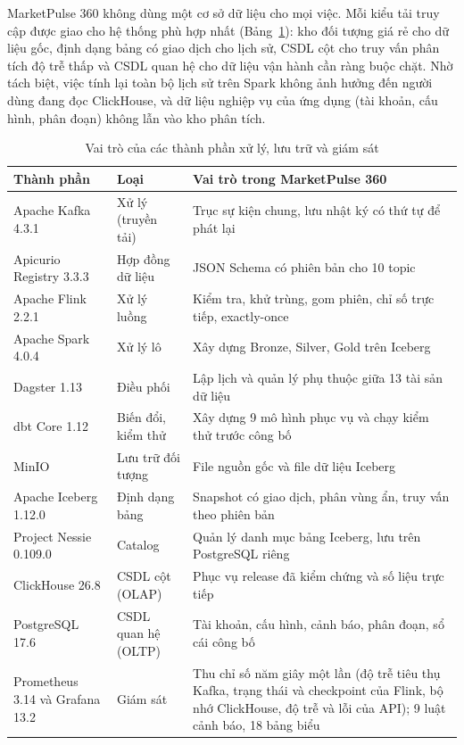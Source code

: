 MarketPulse 360 không dùng một cơ sở dữ liệu cho mọi việc. Mỗi kiểu tải truy cập được giao cho hệ thống phù hợp nhất (Bảng~\ref{tab:components}): kho đối tượng giá rẻ cho dữ liệu gốc, định dạng bảng có giao dịch cho lịch sử, CSDL cột cho truy vấn phân tích độ trễ thấp và CSDL quan hệ cho dữ liệu vận hành cần ràng buộc chặt. Nhờ tách biệt, việc tính lại toàn bộ lịch sử trên Spark không ảnh hưởng đến người dùng đang đọc ClickHouse, và dữ liệu nghiệp vụ của ứng dụng (tài khoản, cấu hình, phân đoạn) không lẫn vào kho phân tích.

\begin{table}[!htbp]
\centering
\caption{Vai trò của các thành phần xử lý, lưu trữ và giám sát}
\label{tab:components}
\small
\renewcommand{\arraystretch}{1.2}
\begin{tabularx}{\textwidth}{>{\raggedright\arraybackslash}p{3.2cm} >{\raggedright\arraybackslash}p{2.3cm} >{\raggedright\arraybackslash}X}
\toprule
\textbf{Thành phần} & \textbf{Loại} & \textbf{Vai trò trong MarketPulse 360} \\
\midrule
Apache Kafka 4.3.1 & Xử lý (truyền tải) & Trục sự kiện chung, lưu nhật ký có thứ tự để phát lại \\
Apicurio Registry 3.3.3 & Hợp đồng dữ liệu & JSON Schema có phiên bản cho 10 topic \\
Apache Flink 2.2.1 & Xử lý luồng & Kiểm tra, khử trùng, gom phiên, chỉ số trực tiếp, exactly-once \\
Apache Spark 4.0.4 & Xử lý lô & Xây dựng Bronze, Silver, Gold trên Iceberg \\
Dagster 1.13 & Điều phối & Lập lịch và quản lý phụ thuộc giữa 13 tài sản dữ liệu \\
dbt Core 1.12 & Biến đổi, kiểm thử & Xây dựng 9 mô hình phục vụ và chạy kiểm thử trước công bố \\
\midrule
MinIO & Lưu trữ đối tượng & File nguồn gốc và file dữ liệu Iceberg \\
Apache Iceberg 1.12.0 & Định dạng bảng & Snapshot có giao dịch, phân vùng ẩn, truy vấn theo phiên bản \\
Project Nessie 0.109.0 & Catalog & Quản lý danh mục bảng Iceberg, lưu trên PostgreSQL riêng \\
ClickHouse 26.8 & CSDL cột (OLAP) & Phục vụ release đã kiểm chứng và số liệu trực tiếp \\
PostgreSQL 17.6 & CSDL quan hệ (OLTP) & Tài khoản, cấu hình, cảnh báo, phân đoạn, sổ cái công bố \\
\midrule
Prometheus 3.14 và Grafana 13.2 & Giám sát & Thu chỉ số năm giây một lần (độ trễ tiêu thụ Kafka, trạng thái và checkpoint của Flink, bộ nhớ ClickHouse, độ trễ và lỗi của API); 9 luật cảnh báo, 18 bảng biểu \\
\bottomrule
\end{tabularx}
\end{table}

